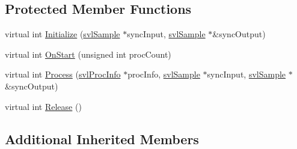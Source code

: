 \subsection*{Protected Member Functions}
\begin{DoxyCompactItemize}
\item 
virtual int \hyperlink{classsvl_filter_video_file_writer_a37152ff6535f864923053175f67d763f}{Initialize} (\hyperlink{classsvl_sample}{svl\-Sample} $\ast$sync\-Input, \hyperlink{classsvl_sample}{svl\-Sample} $\ast$\&sync\-Output)
\item 
virtual int \hyperlink{classsvl_filter_video_file_writer_a22dbf1d4a413e6b41cd64556199ea137}{On\-Start} (unsigned int proc\-Count)
\item 
virtual int \hyperlink{classsvl_filter_video_file_writer_a817c0d367601028d3f91911e835fd5a5}{Process} (\hyperlink{structsvl_proc_info}{svl\-Proc\-Info} $\ast$proc\-Info, \hyperlink{classsvl_sample}{svl\-Sample} $\ast$sync\-Input, \hyperlink{classsvl_sample}{svl\-Sample} $\ast$\&sync\-Output)
\item 
virtual int \hyperlink{classsvl_filter_video_file_writer_a4549c68220e9486bf5bc2e67e9b20d9f}{Release} ()
\end{DoxyCompactItemize}
\subsection*{Additional Inherited Members}


